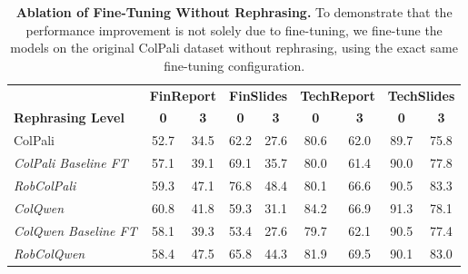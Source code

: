 \begin{table*}[t]
\footnotesize
\renewcommand{\arraystretch}{1.5} %
\setlength\tabcolsep{4pt} %
\caption{
\textbf{Ablation of Fine-Tuning Without Rephrasing.} To demonstrate that the performance improvement is not solely due to fine-tuning, we fine-tune the models on the original ColPali dataset without rephrasing, using the exact same fine-tuning configuration.}
\centering
\begin{tabular*}{1.03\linewidth}{@{\extracolsep{\fill}}l cc cc cc cc} 
\toprule
 & \multicolumn{2}{c}{\textbf{FinReport}} & \multicolumn{2}{c}{\textbf{FinSlides}} & \multicolumn{2}{c}{\textbf{TechReport}} & \multicolumn{2}{c}{\textbf{TechSlides}} \\
\textbf{Rephrasing Level} & \textbf{0} & \textbf{3} & \textbf{0} & \textbf{3} & \textbf{0} & \textbf{3} & \textbf{0} & \textbf{3} \\

\midrule
ColPali & 
52.7 & 34.5 &  
62.2 & 27.6 & 
80.6 & 62.0 & 
89.7 & 75.8 \\
\hspace{0.3cm}\textit{ColPali Baseline FT} & 
57.1 & 39.1 & 
69.1 & 35.7 & 
80.0 & 61.4 & 
90.0 & 77.8 \\
\hspace{0.3cm}\textit{RobColPali} & 
59.3 & 47.1 & 
76.8 & 48.4 & 
80.1 & 66.6 & 
90.5 & 83.3 \\
\textit{ColQwen} & 
60.8 & 41.8 & 
59.3 & 31.1 & 
84.2 & 66.9 & 
91.3 & 78.1 \\
\hspace{0.3cm}\textit{ColQwen Baseline FT} & 
58.1 & 39.3 & 
53.4 & 27.6 & 
79.7 & 62.1 & 
90.5 & 77.4 \\
\hspace{0.3cm}\textit{RobColQwen} & 
58.4 & 47.5 & 
65.8 & 44.3 & 
81.9 & 69.5 & 
90.1 & 83.0 \\

\bottomrule
\end{tabular*}
\label{Table:Training_Set_ablation}
\end{table*}


